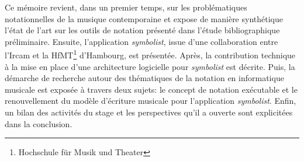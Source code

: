 Ce mémoire revient, dans un premier temps, sur les problématiques notationnelles de la musique contemporaine et expose de manière synthétique l'état de l'art sur les outils de notation présenté dans l'étude bibliographique préliminaire. Ensuite, l'application \textit{symbolist}, issue d'une collaboration entre l'Ircam et la HfMT\footnote{Hochschule für Musik und Theater} d'Hambourg, est présentée. Après, la contribution technique à la mise en place d'une architecture logicielle pour \textit{symbolist} est décrite. Puis, la démarche de recherche autour des thématiques de la notation en informatique musicale est exposée à travers deux sujets: le concept de notation exécutable et le renouvellement du modèle d'écriture musicale pour l'application \textit{symbolist}. Enfin, un bilan des activités du stage et les perspectives qu'il a ouverte sont explicitées dans la conclusion.




